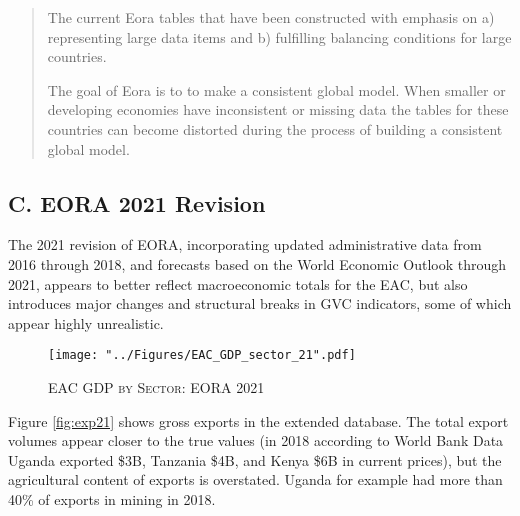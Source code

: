 \documentclass[a4paper]{article}
\begin{document}
\begin{quote}
The current Eora tables that have been constructed with emphasis on a) representing large data items and b) fulfilling balancing conditions for large countries.

The goal of Eora is to to make a consistent global model. When smaller or developing economies have inconsistent or missing data the tables for these countries can become distorted during the process of building a consistent global model. %
\end{quote}




\subsection*{C. EORA 2021 Revision}
\setcounter{table}{0}
\renewcommand{\thetable}{C\arabic{table}}
\setcounter{figure}{0}
\renewcommand{\thefigure}{C\arabic{figure}}

The 2021 revision of EORA, incorporating updated administrative data from 2016 through 2018, and forecasts based on the World Economic Outlook through 2021, appears to better reflect macroeconomic totals for the EAC, but also introduces major changes and structural breaks in GVC indicators, some of which appear highly unrealistic. 

\begin{figure}[h!]
\centering
\caption{\label{fig:EAC_GDP_sec_21}\textsc{EAC GDP by Sector: EORA 2021}}
\texttt{[image: "../Figures/EAC\_GDP\_sector\_21".pdf]} %
\end{figure}
\FloatBarrier


Figure \ref{fig:exp21} shows gross exports in the extended database. The total export volumes appear closer to the true values (in 2018 according to World Bank Data Uganda exported \$3B, Tanzania \$4B, and Kenya \$6B in current prices), but the agricultural content of exports is overstated. Uganda for example had more than 40\% of exports in mining in 2018. 
\end{document}
